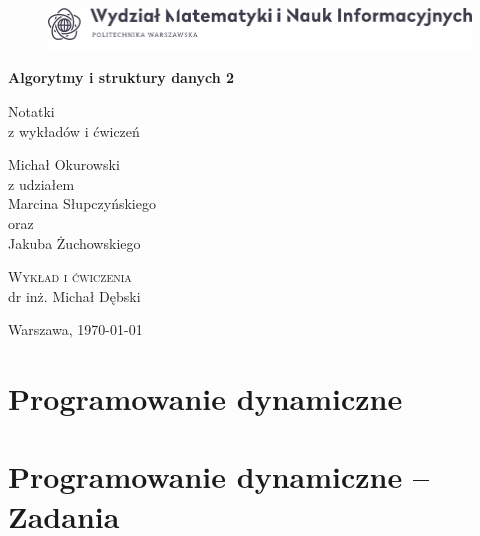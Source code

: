 



\begin{titlepage}
	\begin{center}
		\begin{figure}[h!]
			\centering
			\includegraphics[width=\textwidth]{data/logo.png}
		\end{figure}
		
		\vspace*{3cm}
		\Huge\textbf{Algorytmy i struktury danych 2}
		
		\vspace{1cm}
		\LARGE Notatki \\ \Large z wykładów i ćwiczeń 
		
		\vspace{3cm}
		\Large Michał Okurowski \\
		
		\vspace{1cm}
		\normalsize z udziałem \\
		\large Marcina Słupczyńskiego \\
		\normalsize oraz \\
		\large Jakuba Żuchowskiego
		
		\vspace{3.5cm}	
		\normalsize\textsc{Wykład i ćwiczenia}\\ dr inż. Michał Dębski
		
		\vfill	
		\normalsize
		Warszawa, \today
		
	\end{center}
\end{titlepage}


\tableofcontents
\pagebreak

\section{Programowanie dynamiczne}

\section{Programowanie dynamiczne -- Zadania}

